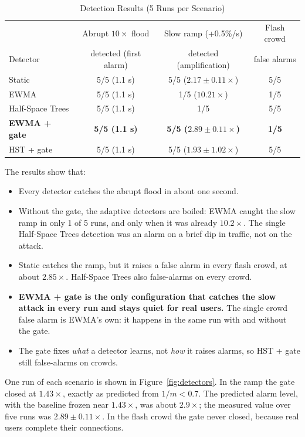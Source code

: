 \documentclass[12pt,a4paper]{article}
\begin{document}
\begin{table}[H]
\centering
\caption{Detection Results (5 Runs per Scenario)}
\label{tab:detection}
\small
\begin{tabular}{lccc}
\toprule
& Abrupt $10\times$ flood & Slow ramp (+0.5\%/s) & Flash crowd \\
Detector & detected (first alarm) & detected (amplification) & false alarms \\
\midrule
Static           & 5/5 (1.1 s) & 5/5 ($2.17 \pm 0.11\times$) & 5/5 \\
EWMA             & 5/5 (1.1 s) & 1/5 ($10.21\times$)          & 1/5 \\
Half-Space Trees & 5/5 (1.1 s) & 1/5                          & 5/5 \\
\textbf{EWMA + gate} & \textbf{5/5 (1.1 s)} & \textbf{5/5 ($2.89 \pm 0.11\times$)} & \textbf{1/5} \\
HST + gate       & 5/5 (1.1 s) & 5/5 ($1.93 \pm 1.02\times$) & 5/5 \\
\bottomrule
\end{tabular}
\end{table}

The results show that:
\begin{itemize}
  \item Every detector catches the abrupt flood in about one second.
  \item Without the gate, the adaptive detectors are boiled: EWMA caught the slow
  ramp in only 1 of 5 runs, and only when it was already $10.2\times$. The
  single Half-Space Trees detection was an alarm on a brief dip in traffic, not
  on the attack.
  \item Static catches the ramp, but it raises a false alarm in every flash
  crowd, at about $2.85\times$. Half-Space Trees also false-alarms on every
  crowd.
  \item \textbf{EWMA + gate is the only configuration that catches the slow
  attack in every run and stays quiet for real users.} The single crowd false
  alarm is EWMA's own: it happens in the same run with and without the gate.
  \item The gate fixes \emph{what} a detector learns, not \emph{how} it raises
  alarms, so HST + gate still false-alarms on crowds.
\end{itemize}

One run of each scenario is shown in Figure~\ref{fig:detectors}. In the ramp the
gate closed at $1.43\times$, exactly as predicted from $1/m < 0.7$. The predicted
alarm level, with the baseline frozen near $1.43\times$, was about $2.9\times$;
the measured value over five runs was $2.89 \pm 0.11\times$. In the flash crowd
the gate never closed, because real users complete their connections.
\end{document}
